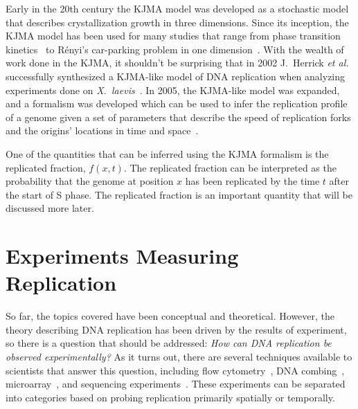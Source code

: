 	Early in the 20th century the KJMA model was developed as a stochastic model that describes crystallization growth in three dimensions\cite{Kolmogorov, JohnsonAndMehl, AvramiI, AvramiII, AvramiIII}.
	Since its inception, the KJMA model has been used for many studies that range from phase transition kinetics~\cite{AlloyPhaseTransitions} to R{\'e}nyi's car-parking problem in one dimension~\cite{CarParking}.
	With the wealth of work done in the KJMA, it shouldn't be surprising that in 2002 J.~Herrick \emph{et al.} successfully synthesized a KJMA-like model of DNA replication when analyzing experiments done on \emph{X.~laevis}~\cite{KJMA2002}.
	In 2005, the KJMA-like model was expanded, and a formalism was developed which can be used to infer the replication profile of a genome given a set of parameters that describe the speed of replication forks and the origins' locations in time and space~\cite{KJMA1, KJMA2}.
	
	One of the quantities that can be inferred using the KJMA formalism is the replicated fraction, $f(x,t)$.
	The replicated fraction can be interpreted as the probability that the genome at position $x$ has been replicated by the time $t$ after the start of S phase.
	The replicated fraction is an important quantity that will be discussed more later.
	
	
	\section{Experiments Measuring Replication}
	\label{sec:Experiments}
	
	So far, the topics covered have been conceptual and theoretical.
	However, the theory describing DNA replication has been driven by the results of experiment, so there is a question that should be addressed:
	\emph{How can DNA replication be observed experimentally?}
	As it turns out, there are several techniques available to scientists that answer this question, including flow cytometry~\cite{DeepSeq}, DNA combing~\cite{DNACombing}, microarray~\cite{MicroarrayReview, McCuneMicroArray}, and sequencing experiments~\cite{DeepSeq}.
	These experiments can be separated into categories based on probing replication primarily spatially or temporally.
	
